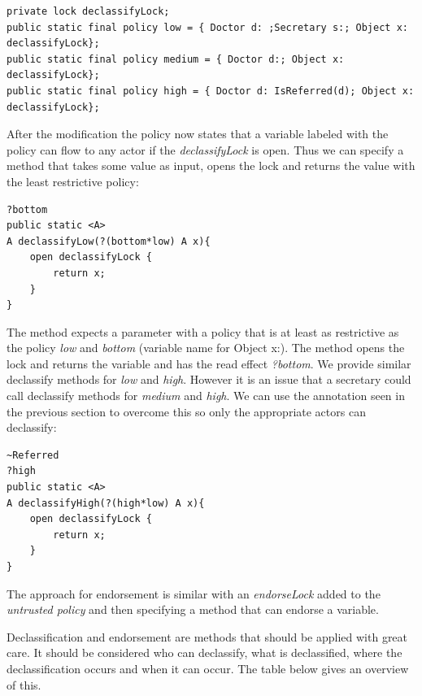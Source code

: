 \begin{lstlisting}
private lock declassifyLock;
public static final policy low = { Doctor d: ;Secretary s:; Object x: declassifyLock};
public static final policy medium = { Doctor d:; Object x: declassifyLock};
public static final policy high = { Doctor d: IsReferred(d); Object x: declassifyLock};
\end{lstlisting}

After the modification the policy now states that a variable labeled with the policy can flow to any actor if the \emph{declassifyLock} is open. Thus we can specify a method that takes some value as input, opens the lock and returns the value with the least restrictive policy:

\begin{lstlisting}
?bottom
public static <A> 
A declassifyLow(?(bottom*low) A x){
	open declassifyLock {
		return x;
	}
}
\end{lstlisting}

The method expects a parameter with a policy that is at least as restrictive as the policy \emph{low} and \emph{bottom} (variable name for {Object x:}). The method opens the lock and returns the variable and has the read effect \emph{?bottom}.  We provide similar declassify methods for \emph{low} and \emph{high}. However it is an issue that a secretary could call declassify methods for \emph{medium} and \emph{high}. We can use the annotation seen in the previous section to overcome this so only the appropriate actors can declassify:

\begin{lstlisting}
~Referred
?high
public static <A> 
A declassifyHigh(?(high*low) A x){
	open declassifyLock {
		return x;
	}
}
\end{lstlisting}

The approach for endorsement is similar with an \emph{endorseLock} added to the \emph{untrusted policy} and then specifying a method that can endorse a variable.

Declassification and endorsement are methods that should be applied with great care. It should be considered who can declassify, what is declassified, where the declassification occurs and when it can occur. The table below gives an overview of this.

